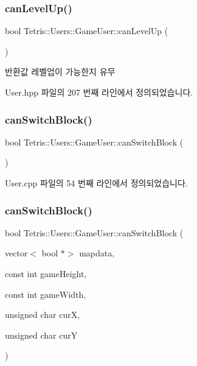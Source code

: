 \subsubsection{\texorpdfstring{can\+Level\+Up()}{canLevelUp()}}
{\footnotesize\ttfamily bool Tetris\+::\+Users\+::\+Game\+User\+::can\+Level\+Up (\begin{DoxyParamCaption}{ }\end{DoxyParamCaption})\hspace{0.3cm}{\ttfamily [inline]}}

\begin{DoxyReturn}{반환값}
레벨업이 가능한지 유무 
\end{DoxyReturn}


User.\+hpp 파일의 207 번째 라인에서 정의되었습니다.

\mbox{\label{class_tetris_1_1_users_1_1_game_user_a8a777ef1ffbbc53ebae4172830863eb4}} 
\subsubsection{\texorpdfstring{can\+Switch\+Block()}{canSwitchBlock()}\hspace{0.1cm}{\footnotesize\ttfamily [1/2]}}
{\footnotesize\ttfamily bool Tetris\+::\+Users\+::\+Game\+User\+::can\+Switch\+Block (\begin{DoxyParamCaption}{ }\end{DoxyParamCaption})}



User.\+cpp 파일의 54 번째 라인에서 정의되었습니다.

\mbox{\label{class_tetris_1_1_users_1_1_game_user_a1962ed051506010440645f7f3b50760d}} 
\subsubsection{\texorpdfstring{can\+Switch\+Block()}{canSwitchBlock()}\hspace{0.1cm}{\footnotesize\ttfamily [2/2]}}
{\footnotesize\ttfamily bool Tetris\+::\+Users\+::\+Game\+User\+::can\+Switch\+Block (\begin{DoxyParamCaption}\item[{vector$<$ bool $\ast$$>$}]{mapdata,  }\item[{const int}]{game\+Height,  }\item[{const int}]{game\+Width,  }\item[{unsigned char}]{curX,  }\item[{unsigned char}]{curY }\end{DoxyParamCaption})\hspace{0.3cm}{\ttfamily [inline]}}

